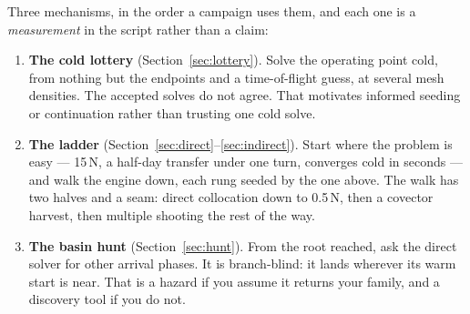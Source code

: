 \documentclass[11pt]{article}
\begin{document}
\begin{intu}
Three mechanisms, in the order a campaign uses them, and each one is a
\emph{measurement} in the script rather than a claim:
\begin{enumerate}[nosep]
\item \textbf{The cold lottery} (Section~\ref{sec:lottery}). Solve the operating
      point cold, from nothing but the endpoints and a time-of-flight guess,
      at several mesh densities. The accepted solves do not agree. That
      motivates informed seeding or continuation rather than trusting one
      cold solve.
\item \textbf{The ladder} (Section~\ref{sec:direct}--\ref{sec:indirect}). Start
      where the problem is easy --- 15\,N, a half-day transfer under one
      turn, converges cold in seconds --- and walk the engine down, each rung
      seeded by the one above. The walk has two halves and a seam: direct
      collocation down to 0.5\,N, then a covector harvest, then multiple
      shooting the rest of the way.
\item \textbf{The basin hunt} (Section~\ref{sec:hunt}). From the root reached, ask
      the direct solver for other arrival phases. It is branch-blind: it lands
      wherever its warm start is near. That is a hazard if you assume it
      returns your family, and a discovery tool if you do not.
\end{enumerate}
\end{intu}
\end{document}
